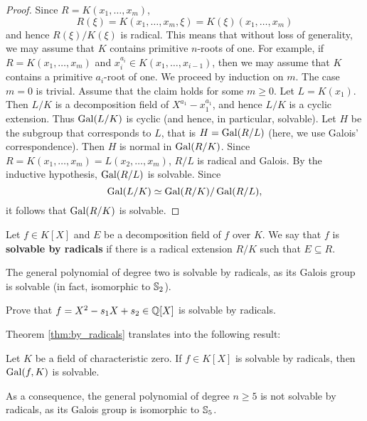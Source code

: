 \begin{proof}
    Since
    $R=K(x_1,\dots,x_m)$,  
    \[
    R(\xi)=K(x_1,\dots,x_m,\xi)=K(\xi)(x_1,\dots,x_m)
    \]
    and hence $R(\xi)/K(\xi)$ is radical. 
    This means that
    without loss of generality, we may assume that
    $K$ contains primitive $n$-roots of one. For example, 
    if $R=K(x_1,\dots,x_m)$ and $x_i^{a_i}\in K(x_1,\dots,x_{i-1})$, 
    then we may assume that $K$ contains a primitive $a_i$-root of one. We proceed by induction on $m$. 
    The case $m=0$ is trivial. Assume that the claim holds for some $m\geq0$. Let 
    $L=K(x_1)$. Then $L/K$ is a decomposition field of $X^{a_1}-x_1^{a_1}$, and hence
    $L/K$ is a cyclic extension. Thus $\operatorname{Gal}(L/K)$ is cyclic (and hence, in particular, solvable). 
    Let $H$ be the subgroup that corresponds to $L$, that is
    $H=\operatorname{Gal}(R/L)$ (here, we use Galois' correspondence). Then $H$ is normal in $\operatorname{Gal}(R/K)$. 
    Since $R=K(x_1,\dots,x_m)=L(x_2,\dots,x_m)$, $R/L$ is radical and Galois. By the inductive hypothesis, 
    $\operatorname{Gal}(R/L)$ is solvable. Since 
    \[
    \operatorname{Gal}(L/K)\simeq \operatorname{Gal}(R/K)/\operatorname{Gal}(R/L),
    \]
    it follows that $\operatorname{Gal}(R/K)$ is solvable. 
\end{proof}

\begin{definition}
    Let $f\in K[X]$ and $E$ be a decomposition field of $f$ over $K$. 
    We say that $f$ is \textbf{solvable by radicals} if
    there is a radical extension $R/K$ such that $E\subseteq R$. 
\end{definition}

The general polynomial of degree two 
is solvable by radicals, as its Galois group 
is solvable (in fact, isomorphic to $\mathbb{S}_2$).  

\begin{exercise}
    Prove that $f=X^2-s_1X+s_2\in\mathbb{Q}[X]$ is solvable by radicals. 
\end{exercise}

Theorem \ref{thm:by_radicals} translates into the following result:

\begin{exercise}
    Let $K$ be a field of characteristic zero. 
    If $f\in K[X]$ is solvable by radicals, then $\operatorname{Gal}(f,K)$ is solvable. 
\end{exercise}

As a consequence, the general polynomial of degree $n\geq5$ 
is not solvable by radicals, as its Galois group is isomorphic to 
$\mathbb{S}_5$. 

